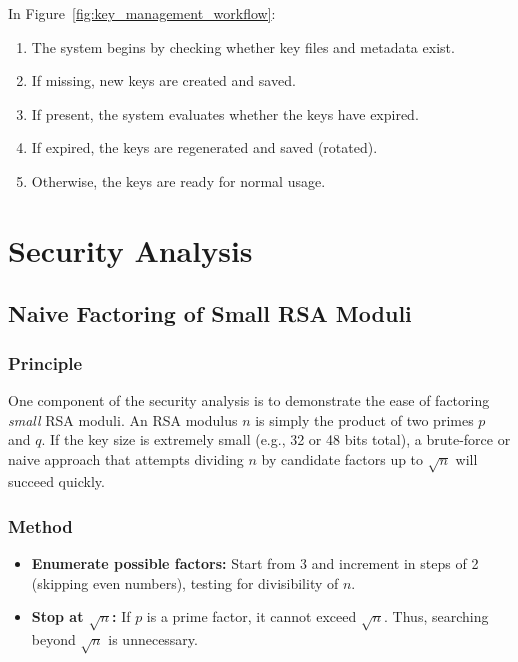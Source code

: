 \documentclass[12pt]{article}
\begin{document}
In Figure~\ref{fig:key_management_workflow}:
\begin{enumerate}
    \item The system begins by checking whether key files and metadata exist.
    \item If missing, new keys are created and saved.
    \item If present, the system evaluates whether the keys have expired.
    \item If expired, the keys are regenerated and saved (rotated).
    \item Otherwise, the keys are ready for normal usage.
\end{enumerate}

\section{Security Analysis}

\subsection{Naive Factoring of Small RSA Moduli}
\subsubsection{Principle}
One component of the security analysis is to demonstrate the ease of factoring \emph{small} RSA moduli. An RSA modulus \(n\) is simply the product of two primes \(p\) and \(q\). If the key size is extremely small (e.g., 32 or 48 bits total), a brute-force or naive approach that attempts dividing \(n\) by candidate factors up to \(\sqrt{n}\) will succeed quickly.

\subsubsection{Method}
\begin{itemize}
    \item \textbf{Enumerate possible factors:} Start from 3 and increment in steps of 2 (skipping even numbers), testing for divisibility of \(n\).
    \item \textbf{Stop at \(\sqrt{n}\):} If \(p\) is a prime factor, it cannot exceed \(\sqrt{n}\). Thus, searching beyond \(\sqrt{n}\) is unnecessary.
\end{itemize}
\end{document}
